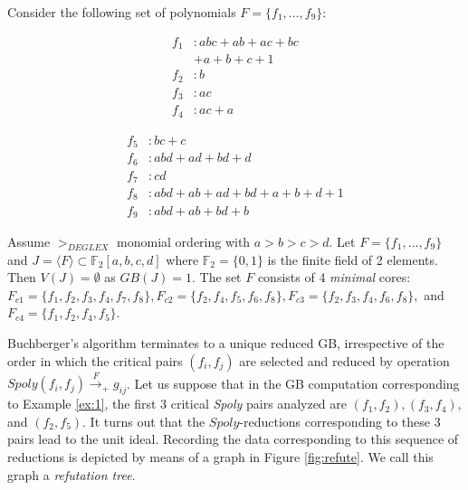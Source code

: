 \begin{Example}
\label{ex:1}
Consider the following set of polynomials $F = \{f_1,\dots, f_9\}$:

\begin{minipage}{2in}
\begin{align*}
f_1&: abc + ab + ac + bc \\
   & + a + b + c + 1\\
f_2&: b\\
f_3&: ac\\
f_4&: ac + a
\end{align*}
\end{minipage}
\begin{minipage}{3in}
\begin{align*}
f_5&: bc + c\\
f_6&: abd + ad + bd + d\\
f_7&: cd\\
f_8&: abd + ab + ad + bd + a + b + d + 1\\
f_9&: abd + ab +bd + b
\end{align*}
\end{minipage}



Assume $>_{DEGLEX}$ monomial ordering with $a>b>c>d$. 
Let $F = \{f_1,\dots,f_9\}$ and 
$J = \langle F \rangle \subset \mathbb{F}_2[a,b,c,d]$ where
$\mathbb{F}_2 = \{0, 1\}$ is the finite field of 2 elements. Then 
$V(J) = \emptyset$ as $GB(J) = 1$.  The set $F$ consists of 4 {\it minimal}
cores: $F_{c1} = \{ f_1,f_2,f_3,f_4,f_7,f_8\}, F_{c2} = \{
f_2,f_4,f_5,f_6,f_8\}, F_{c3} = \{ f_2,f_3,f_4,f_6,f_8\},$ and $F_{c4}
= \{ f_1,f_2,f_4,f_5\}$. 
\end{Example}

Buchberger's algorithm terminates to a unique reduced GB, irrespective
of the order in which the critical pairs $(f_i,f_j)$ are selected and reduced by operation
$Spoly(f_i,f_j)\xrightarrow{F}_+g_{ij}$. Let us suppose that in the GB
computation corresponding to Example \ref{ex:1}, the first 3 critical
{\it Spoly} pairs analyzed are $(f_1, f_2), (f_3, f_4)$, and
$(f_2,f_5)$. It turns out that the $Spoly$-reductions corresponding to
these 3 pairs lead to the unit ideal. Recording the data
corresponding to this sequence of reductions is depicted by means of a
graph in Figure \ref{fig:refute}. We call this graph a {\it refutation tree}. 

